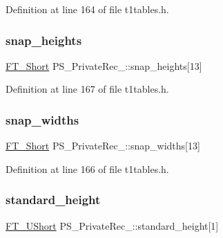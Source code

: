 Definition at line 164 of file t1tables.\+h.

\mbox{\label{struct_p_s___private_rec___a3583caf0cc05de2afac098574ed0bc4b}} 
\subsubsection{\texorpdfstring{snap\_heights}{snap\_heights}}
{\footnotesize\ttfamily \mbox{\hyperlink{fttypes_8h_aa7279be89046a2563cd3d4d6651fbdcf}{F\+T\+\_\+\+Short}} P\+S\+\_\+\+Private\+Rec\+\_\+\+::snap\+\_\+heights\mbox{[}13\mbox{]}}



Definition at line 167 of file t1tables.\+h.

\mbox{\label{struct_p_s___private_rec___a39cf1a4b21280bf8082ccba0f4824a8a}} 
\subsubsection{\texorpdfstring{snap\_widths}{snap\_widths}}
{\footnotesize\ttfamily \mbox{\hyperlink{fttypes_8h_aa7279be89046a2563cd3d4d6651fbdcf}{F\+T\+\_\+\+Short}} P\+S\+\_\+\+Private\+Rec\+\_\+\+::snap\+\_\+widths\mbox{[}13\mbox{]}}



Definition at line 166 of file t1tables.\+h.

\mbox{\label{struct_p_s___private_rec___a89aed70a7b26aafe320e7733eaeb400e}} 
\subsubsection{\texorpdfstring{standard\_height}{standard\_height}}
{\footnotesize\ttfamily \mbox{\hyperlink{fttypes_8h_a937f6c17cf5ffd09086d8610c37b9f58}{F\+T\+\_\+\+U\+Short}} P\+S\+\_\+\+Private\+Rec\+\_\+\+::standard\+\_\+height\mbox{[}1\mbox{]}}



